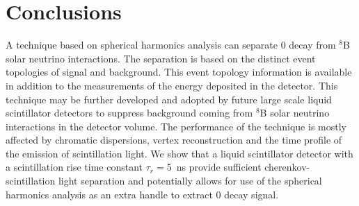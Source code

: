 \section{Conclusions}
A technique based on spherical harmonics analysis can
separate 0{\nbb} decay from $^{8}$B solar neutrino interactions. The
separation is based on the distinct event topologies of signal and
background. This event topology information is available in addition
to the measurements of the energy deposited in the detector. This
technique may be further developed and adopted by future large scale
liquid scintillator detectors to suppress background coming from
$^{8}$B solar neutrino interactions in the detector volume. The
performance of the technique is mostly affected by chromatic
dispersions, vertex reconstruction and the time profile of the emission of scintillation light. We show that a liquid scintillator detector
with a scintillation rise time constant $\tau_r=$5~ns provide sufficient cherenkov-scintillation light separation and potentially allows
for use of the spherical harmonics analysis
as an extra handle to extract 0{\nbb} decay signal.

